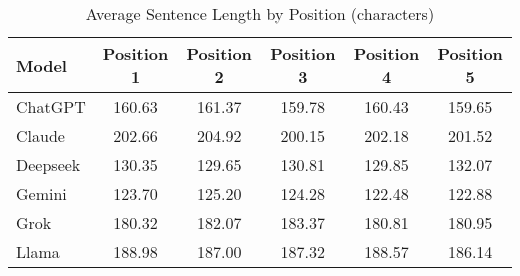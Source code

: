\begin{table}[ht]
\centering
\caption{Average Sentence Length by Position (characters)}
\begin{tabular}{l|ccccc}
\hline
Model & Position 1 & Position 2 & Position 3 & Position 4 & Position 5 \\ \hline
ChatGPT & 160.63 & 161.37 & 159.78 & 160.43 & 159.65 \\
Claude & 202.66 & 204.92 & 200.15 & 202.18 & 201.52 \\
Deepseek & 130.35 & 129.65 & 130.81 & 129.85 & 132.07 \\
Gemini & 123.70 & 125.20 & 124.28 & 122.48 & 122.88 \\
Grok & 180.32 & 182.07 & 183.37 & 180.81 & 180.95 \\
Llama & 188.98 & 187.00 & 187.32 & 188.57 & 186.14 \\
\hline
\end{tabular}
\label{tab:position_lengths}
\end{table}